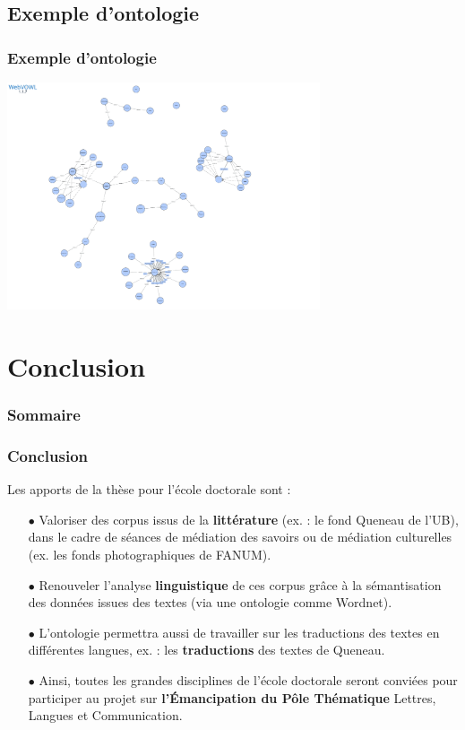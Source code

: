 \documentclass[xcolor=dvipsnames]{beamer}
\begin{document}
\subsection{Exemple d'ontologie}
\begin{frame}[fragile]
\frametitle{Exemple d'ontologie}
	\includegraphics[height = 6.7cm]{images/Ontologie_1.png}
\end{frame}

\section{Conclusion}
\begin{frame}
\frametitle{Sommaire}
\tableofcontents[currentsection]
\end{frame}

\begin{frame}[fragile]
\frametitle{Conclusion}
\begin{block}{Les apports de la thèse pour l'école doctorale sont :}
	\small{
		\begin{itemize}
			\item[$\bullet$]Valoriser des corpus issus de la \textbf{littérature} (ex. : le fond Queneau de l'UB), dans le cadre de séances de médiation des savoirs ou de médiation culturelles (ex. les fonds photographiques de FANUM).
			\item[$\bullet$]Renouveler l'analyse \textbf{linguistique} de ces corpus grâce à la sémantisation des données issues des textes (via une ontologie comme Wordnet).
			\item[$\bullet$]L'ontologie permettra aussi de travailler sur les traductions des textes en différentes langues, ex. : les \textbf{traductions} des textes de Queneau.
			\item[$\bullet$]Ainsi, toutes les grandes disciplines de l'école doctorale seront conviées pour participer au projet sur \textbf{l'Émancipation du Pôle Thématique} Lettres, Langues et Communication.
	\end{itemize}}
\end{block}
\vspace{3cm}
\end{frame}
\end{document}
